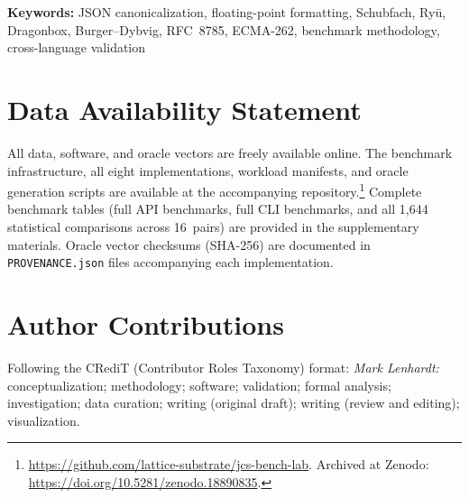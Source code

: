 \documentclass[12pt]{article}
\theoremstyle{definition}
\theoremstyle{remark}
\begin{document}
\noindent\textbf{Keywords:} JSON canonicalization, floating-point formatting, Schubfach,
Ry\=u, Dragonbox, Burger--Dybvig, RFC~8785, ECMA-262, benchmark methodology, cross-language validation












\section*{Data Availability Statement}

All data, software, and oracle vectors are freely available online.
The benchmark infrastructure, all eight implementations, workload manifests,
and oracle generation scripts are available at the accompanying
repository.\footnote{\url{https://github.com/lattice-substrate/jcs-bench-lab}.
Archived at Zenodo: \url{https://doi.org/10.5281/zenodo.18890835}.}  Complete benchmark tables (full API benchmarks,
full CLI benchmarks, and all 1{,}644 statistical comparisons across
16~pairs) are provided in the supplementary materials.  Oracle vector
checksums (SHA-256) are documented in \texttt{PROVENANCE.json} files
accompanying each implementation.

\section*{Author Contributions}

Following the CRediT (Contributor Roles Taxonomy) format:
\textit{Mark Lenhardt:} conceptualization; methodology;
software; validation; formal analysis; investigation; data curation;
writing (original draft); writing (review and editing); visualization.




\clearpage
\appendix


\end{document}
